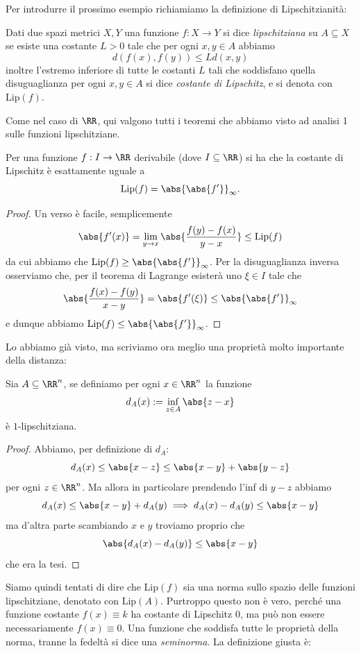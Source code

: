 \documentclass[11pt]{scrartcl}
\begin{document}
	Per introdurre il prossimo esempio richiamiamo la definizione di Lipschitzianità:
	\begin{definition}
		Dati due spazi metrici $X,Y$ una funzione $f:X\to Y$ si dice \textit{lipschitziana} su $A\subseteq X$ se esiste una costante $L>0$ tale che per ogni $x,y\in A$ abbiamo
		$$d\left(f(x),f(y)\right)\le Ld\left(x,y\right)$$
		inoltre l'estremo inferiore di tutte le costanti $L$ tali che soddisfano quella disuguaglianza per ogni $x,y\in A$ si dice \textit{costante di Lipschitz}, e si denota con $\text{Lip}(f)$. 
	\end{definition}
	Come nel caso di $\RR$, qui valgono tutti i teoremi che abbiamo visto ad analisi 1 sulle funzioni lipschitziane. 
	\begin{proposition}
		Per una funzione $f:I\to \RR$ derivabile (dove $I\subseteq \RR$) si ha che la costante di Lipschitz è esattamente uguale a
		$$\text{Lip}(f)=\abs{\abs{f'}}_\infty.$$
	\end{proposition}
	\begin{proof}
		Un verso è facile, semplicemente
		$$\abs{f'(x)}=\lim_{y\to x}\abs{\frac{f(y)-f(x)}{y-x}}\le \text{Lip}(f)$$
		da cui abbiamo che $\text{Lip}(f)\ge \abs{\abs{f'}}_\infty$. Per la disuguaglianza inversa osserviamo che, per il teorema di Lagrange esisterà uno $\xi \in I$ tale che
		$$\abs{\frac{f(x)-f(y)}{x-y}}=\abs{f'(\xi)}\le \abs{\abs{f'}}_\infty$$
		e dunque abbiamo $\text{Lip}(f)\le \abs{\abs{f'}}_\infty$.
	\end{proof}
	Lo abbiamo già visto, ma scriviamo ora meglio una proprietà molto importante della distanza:
	\begin{proposition}
		Sia $A\subseteq \RR^n$, se definiamo per ogni $x\in \RR^n$ la funzione
		$$d_A(x):=\inf_{z\in A}\abs{z-x}$$
		è $1$-lipschitziana.
	\end{proposition}
	\begin{proof}
		Abbiamo, per definizione di $d_A$:
		$$d_A(x)\le \abs{x-z}\le \abs{x-y}+\abs{y-z}$$
		per ogni $z\in \RR^n$. Ma allora in particolare prendendo l'inf di $y-z$ abbiamo
		$$d_A(x)\le \abs{x-y}+d_A(y) \implies d_A(x)-d_A(y)\le \abs{x-y}$$
		ma d'altra parte scambiando $x$ e $y$ troviamo proprio che
		$$\abs{d_A(x)-d_A(y)}\le \abs{x-y}$$
		che era la tesi.
	\end{proof}
	Siamo quindi tentati di dire che $\text{Lip}(f)$ sia una norma sullo spazio delle funzioni lipschitziane, denotato con $\text{Lip}(A)$. Purtroppo questo non è vero, perché una funzione costante $f(x)\equiv k$ ha costante di Lipschitz $0$, ma può non essere necessariamente $f(x)\equiv 0$. Una funzione che soddisfa tutte le proprietà della norma, tranne la fedeltà si dice una \textit{seminorma}. La definizione giusta è:
\end{document}
